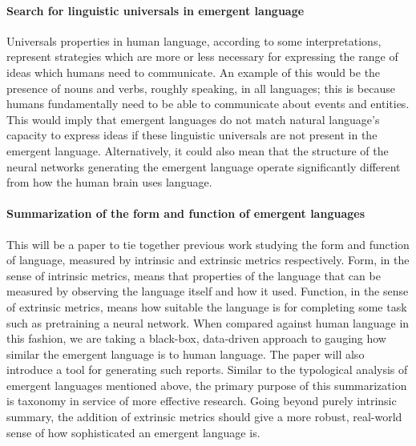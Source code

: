 \paragraph{Search for linguistic universals in emergent language}
Universals properties in human language, according to some interpretations, represent strategies which are more or less necessary for expressing the range of ideas which humans need to communicate.
An example of this would be the presence of nouns and verbs, roughly speaking, in all languages; this is because humans fundamentally need to be able to communicate about events and entities.
This would imply that emergent languages do not match natural language's capacity to express ideas if these linguistic universals are not present in the emergent language.
Alternatively, it could also mean that the structure of the neural networks generating the emergent language operate significantly different from how the human brain uses language.

\paragraph{Summarization of the form and function of emergent languages}
This will be a paper to tie together previous work studying the form and function of language, measured by intrinsic and extrinsic metrics respectively.
Form, in the sense of intrinsic metrics, means that properties of the language that can be measured by observing the language itself and how it used.
Function, in the sense of extrinsic metrics, means how suitable the language is for completing some task such as pretraining a neural network.
When compared against human language in this fashion, we are taking a black-box, data-driven approach to gauging how similar the emergent language is to human language.
The paper will also introduce a tool for generating such reports.
Similar to the typological analysis of emergent languages mentioned above, the primary purpose of this summarization is taxonomy in service of more effective research.
Going beyond purely intrinsic summary, the addition of extrinsic metrics should give a more robust, real-world sense of how sophisticated an emergent language is.

